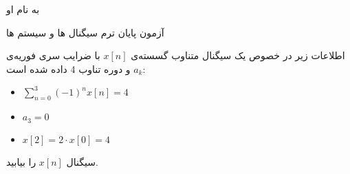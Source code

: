 \documentclass{article}
\begin{document}
\begin{center}
\large

به نام او

آزمون پایان ترم سیگنال ها و سیستم ها
\end{center}

\hrulefill

\large


اطلاعات زیر در خصوص یک سیگنال متناوب گسسته‌ی 
$
x[n]
$
با ضرایب سری فوریه‌ی $a_k$ و دوره تناوب 4 داده شده است:
\begin{itemize}
\item
$
\sum_{n=0}^3(-1)^nx[n]=4
$
\item
$
a_3=0
$
\item
$
x[2]=2\cdot x[0]=4
$
\end{itemize}
 سیگنال $x[n]$ را بیابید.
\end{document}
